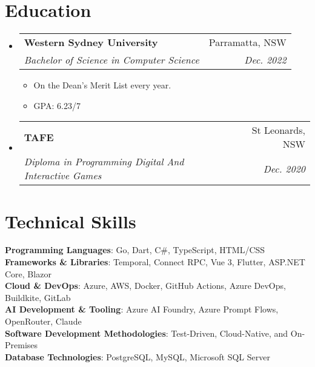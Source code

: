 \documentclass[a4paper,11pt]{article}
\makeatletter
\newcommand{\resumeItem}[1]{
  \item\small{
    {#1 \vspace{-2pt}}
  }
}
\newcommand{\resumeSubheading}[4]{
  \vspace{-2pt}\item
    \begin{tabular*}{0.97\textwidth}[t]{l@{\extracolsep{\fill}}r}
      \textbf{#1} & #2 \\
      \textit{\small#3} & \textit{\small #4} \\
    \end{tabular*}\vspace{-7pt}
}
\newcommand{\resumeSubHeadingListStart}{\begin{itemize}[leftmargin=0.15in, label={}]}
\newcommand{\resumeSubHeadingListEnd}{\end{itemize}}
\newcommand{\resumeItemListStart}{\begin{itemize}}
\newcommand{\resumeItemListEnd}{\end{itemize}\vspace{-5pt}}
\makeatother
\begin{document}
\section{Education}
  \resumeSubHeadingListStart
    \resumeSubheading
      {Western Sydney University}{Parramatta, NSW}
      {Bachelor of Science in Computer Science}{Dec. 2022}
      \resumeItemListStart
        \resumeItem{On the Dean's Merit List every year.}
        \resumeItem{GPA: 6.23/7}
      \resumeItemListEnd
      
    \resumeSubheading
      {TAFE}{St Leonards, NSW}
      {Diploma in Programming Digital And Interactive Games}{Dec. 2020}

  \resumeSubHeadingListEnd

\section{Technical Skills}
 \begin{itemize}[leftmargin=0.15in, label={}]
    \small{\item{
     \textbf{Programming Languages}{: Go, Dart, C\#, TypeScript, HTML/CSS} \\
     \textbf{Frameworks \& Libraries}{: Temporal, Connect RPC, Vue 3, Flutter, ASP.NET Core, Blazor} \\
     \textbf{Cloud \& DevOps}{: Azure, AWS, Docker, GitHub Actions, Azure DevOps, Buildkite, GitLab} \\
     \textbf{AI Development \& Tooling}{: Azure AI Foundry, Azure Prompt Flows, OpenRouter, Claude} \\
     \textbf{Software Development Methodologies}{: Test-Driven, Cloud-Native, and On-Premises} \\
     \textbf{Database Technologies}{: PostgreSQL, MySQL, Microsoft SQL Server} \\
    }}
 \end{itemize}
\end{document}
